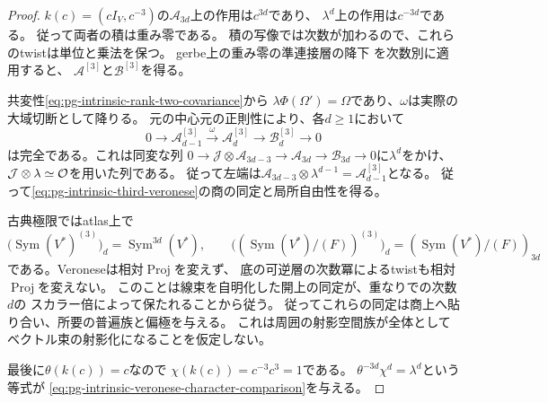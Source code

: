 \begin{proof}
$k(c)=(cI_V,c^{-3})$の$\mathcal A_{3d}$上の作用は$c^{3d}$であり、
$\lambda^d$上の作用は$c^{-3d}$である。
従って両者の積は重み零である。
積の写像では次数が加わるので、これらのtwistは単位と乗法を保つ。
gerbe上の重み零の準連接層の降下
\cite[Proposition~4.10]{PBerghSchnurerGerbes}を次数別に適用すると、
$\mathcal A^{[3]}$と$\mathcal B^{[3]}$を得る。

共変性\eqref{eq:pg-intrinsic-rank-two-covariance}から
$\lambda\Phi(\Omega')=\Omega$であり、$\omega$は実際の大域切断として降りる。
元の中心元の正則性により、各$d\ge1$において
\begin{equation}
 0\longrightarrow\mathcal A^{[3]}_{d-1}
 \xrightarrow{\ \omega\ }\mathcal A^{[3]}_d
 \longrightarrow\mathcal B^{[3]}_d\longrightarrow0
 \label{eq:pg-intrinsic-veronese-quotient-sequence}
\end{equation}
は完全である。これは同変な列
$0\to\mathcal J\otimes\mathcal A_{3d-3}\to\mathcal A_{3d}
\to\mathcal B_{3d}\to0$に$\lambda^d$をかけ、
$\mathcal J\otimes\lambda\simeq\mathcal O$を用いた列である。
従って左端は$\mathcal A_{3d-3}\otimes\lambda^{d-1}=\mathcal A^{[3]}_{d-1}$となる。
従って\eqref{eq:pg-intrinsic-third-veronese}の商の同定と局所自由性を得る。

古典極限ではatlas上で
\begin{equation}
 \bigl(\operatorname{Sym}(V^*)^{(3)}\bigr)_d
     =\operatorname{Sym}^{3d}(V^*),\qquad
 \bigl((\operatorname{Sym}(V^*)/(F))^{(3)}\bigr)_d
     =(\operatorname{Sym}(V^*)/(F))_{3d}
 \label{eq:pg-intrinsic-veronese-classical}
\end{equation}
である。Veroneseは相対$\operatorname{Proj}$を変えず、
底の可逆層の次数冪によるtwistも相対$\operatorname{Proj}$を変えない。
このことは線束を自明化した開上の同定が、重なりでの次数$d$の
スカラー倍によって保たれることから従う。
従ってこれらの同定は商上へ貼り合い、所要の普遍族と偏極を与える。
これは周囲の射影空間族が全体としてベクトル束の射影化になることを仮定しない。

最後に$\theta(k(c))=c$なので
$\chi(k(c))=c^{-3}c^3=1$である。
$\theta^{-3d}\chi^d=\lambda^d$という等式が
\eqref{eq:pg-intrinsic-veronese-character-comparison}を与える。
\end{proof}

